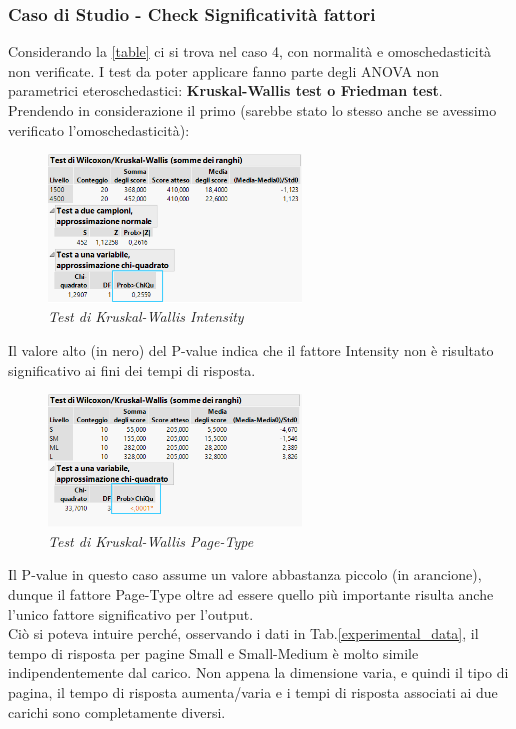 \subsubsection{Caso di Studio - Check Significatività fattori}
Considerando la \ref{table} ci si trova nel caso 4, con normalità e omoschedasticità non verificate. I test da poter applicare fanno parte degli ANOVA non parametrici eteroschedastici: \textbf{Kruskal-Wallis test o Friedman test}.
Prendendo in considerazione il primo (sarebbe stato lo stesso anche se avessimo verificato l'omoschedasticità):
\begin{figure}[H]
	\centering
	\includegraphics[width=0.6\textwidth]{img/hw4/KW_i.png}
	\caption{\textit{Test di Kruskal-Wallis Intensity}}
\end{figure}
Il valore alto (in nero) del P-value indica che il fattore Intensity non è risultato significativo ai fini dei tempi di risposta.
\begin{figure}[H]
	\centering
	\includegraphics[width=0.6\textwidth]{img/hw4/KW_pt.png}
	\caption{\textit{Test di Kruskal-Wallis Page-Type}}
\end{figure}
Il P-value in questo caso assume un valore abbastanza piccolo (in arancione), dunque il fattore Page-Type oltre ad essere quello più importante risulta anche l'unico fattore significativo per l'output.
\\Ciò si poteva intuire perché, osservando i dati in Tab.\ref{experimental_data}, il tempo di risposta per pagine Small e Small-Medium è molto simile indipendentemente dal carico. Non appena la dimensione varia, e quindi il tipo di pagina, il tempo di risposta aumenta/varia e i tempi di risposta associati ai due carichi sono completamente diversi. 